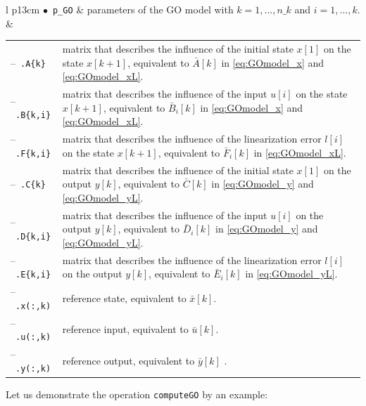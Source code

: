 \begin{center}
\renewcommand{\arraystretch}{1.3}
\begin{tabular}[t]{l p{13cm} }
	$\bullet$~\texttt{p\_GO} & parameters of the GO model with $k=1,...,n\_k$ and $i=1,...,k$. \\
	& \begin{tabular}[t]{l p{10cm}}
		--~\texttt{.A\{k\}} & matrix that describes the influence of the initial state $x[1]$ on the state $x[k+1]$, equivalent to $\bar{A}[k]$ in \eqref{eq:GOmodel_x} and \eqref{eq:GOmodel_xL}.\\
		--~\texttt{.B\{k,i\}} & matrix that describes the influence of the input $u[i]$ on the state $x[k+1]$, equivalent to $\bar{B}_i[k]$ in \eqref{eq:GOmodel_x} and \eqref{eq:GOmodel_xL}.\\
		--~\texttt{.F\{k,i\}} & matrix that describes the influence of the linearization error $l[i]$ on the state $x[k+1]$, equivalent to $\bar{F}_i[k]$ in \eqref{eq:GOmodel_xL}.\\
		--~\texttt{.C\{k\}} & matrix that describes the influence of the initial state $x[1]$ on the output $y[k]$, equivalent to $\bar{C}[k]$ in \eqref{eq:GOmodel_y} and \eqref{eq:GOmodel_yL}.\\
		--~\texttt{.D\{k,i\}} & matrix that describes the influence of the input $u[i]$ on the output $y[k]$, equivalent to $\bar{D}_i[k]$ in \eqref{eq:GOmodel_y} and \eqref{eq:GOmodel_yL}.\\
		--~\texttt{.E\{k,i\}} & matrix that describes the influence of the linearization error $l[i]$ on the output $y[k]$, equivalent to $\bar{E}_i[k]$ in \eqref{eq:GOmodel_yL}.\\
		--~\texttt{.x(:,k)} & reference state, equivalent to $\bar{x}[k]$. \\
		--~\texttt{.u(:,k)} & reference input, equivalent to $\bar{u}[k]$.\\
		--~\texttt{.y(:,k)} & reference output, equivalent to $\bar{y}[k]$ .
	\end{tabular}
\end{tabular}
\end{center}


Let us demonstrate the operation \texttt{computeGO} by an example:


\begin{center}
	\begin{minipage}[t]{\textwidth}
		\footnotesize
		
	\end{minipage}
\end{center}

